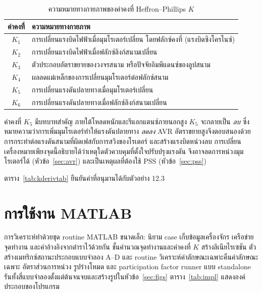 \documentclass[12pt,a4paper]{article}
\begin{document}
\begin{table}[H]
\centering
\caption{ความหมายทางกายภาพของค่าคงที่ Heffron--Phillips $K$}
\label{tab:kmeaning}
\begin{tabular}{@{}c p{11cm}@{}}
\toprule
ค่าคงที่ & ความหมายทางกายภาพ \\
\midrule
$K_1$ & การเปลี่ยนแรงบิดไฟฟ้าเมื่อมุมโรเตอร์เปลี่ยน โดยฟลักซ์คงที่
        (แรงบิดซิงโครไนซ์) \\
$K_2$ & การเปลี่ยนแรงบิดไฟฟ้าเมื่อฟลักซ์ลิงก์สนามเปลี่ยน \\
$K_3$ & ตัวประกอบอัตราขยายของวงจรสนาม หรือปัจจัยอิมพีแดนซ์ของลูปสนาม \\
$K_4$ & ผลลดแม่เหล็กของการเปลี่ยนมุมโรเตอร์ต่อฟลักซ์สนาม \\
$K_5$ & การเปลี่ยนแรงดันปลายทางเมื่อมุมโรเตอร์เปลี่ยน \\
$K_6$ & การเปลี่ยนแรงดันปลายทางเมื่อฟลักซ์ลิงก์สนามเปลี่ยน \\
\bottomrule
\end{tabular}
\end{table}

ค่าคงที่ $K_5$ มีบทบาทสำคัญ ภายใต้โหลดหนักและรีแอกแตนซ์ภายนอกสูง
$K_5$ จะกลายเป็น \emph{ลบ} ซึ่งหมายความว่าการเพิ่มมุมโรเตอร์ทำให้แรงดันปลายทาง \emph{ลดลง}
AVR อัตราขยายสูงจึงตอบสนองด้วยการกระทำต่อแรงดันสนามที่ผิดเฟสกับการสวิงของโรเตอร์
และสร้างแรงบิดหน่วงลบ การเปลี่ยนเครื่องหมายเพียงจุดนี้อธิบายได้ว่าเหตุใดตัวควบคุมที่ตั้งใจปรับปรุงแรงดัน
จึงอาจลดการหน่วงมุมโรเตอร์ได้ (หัวข้อ~\ref{sec:avr}) และเป็นเหตุผลที่ต้องใช้ PSS
(หัวข้อ~\ref{sec:pss})

ตาราง~\ref{tab:kderivtab} ยืนยันค่าที่อนุมานได้กับตัวอย่าง 12.3

\section{การใช้งาน MATLAB}
\label{sec:impl}

การวิเคราะห์ทำด้วยชุด routine MATLAB ขนาดเล็ก:
นิยาม case เก็บข้อมูลเครื่องจักร เครือข่าย จุดทำงาน และค่าอ้างอิงจากตำราไว้ด้วยกัน
ชั้นคำนวณจุดทำงานและค่าคงที่ $K$ สร้างลิเนียไรเซชัน
ตัวสร้างเมทริกซ์สถานะประกอบแบบจำลอง A--D
และ routine วิเคราะห์ค่าลักษณะเฉพาะคืนค่าลักษณะเฉพาะ อัตราส่วนการหน่วง รูปร่างโหมด
และ participation factor
runner แบบ standalone รันทั้งสี่แบบจำลองตั้งแต่ต้นจนจบและสร้างรูปในหัวข้อ~\ref{sec:figs}
ตาราง~\ref{tab:impl} แสดงองค์ประกอบของโปรแกรม
\end{document}
